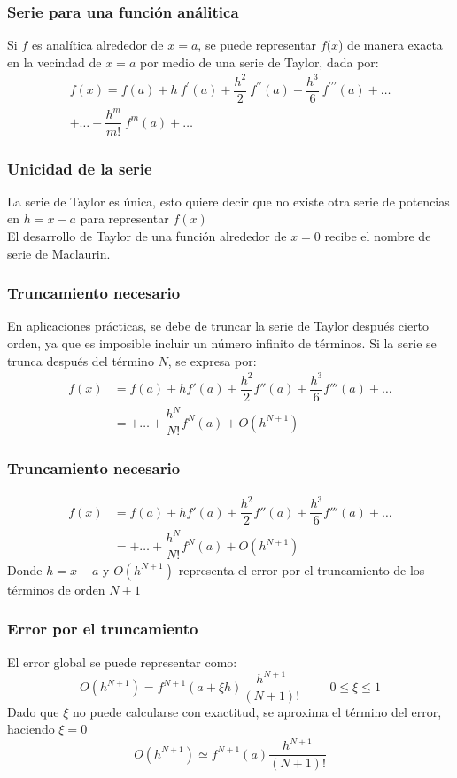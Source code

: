 \begin{frame}
\frametitle{Serie para una función análitica}
Si $f$ es analítica alrededor de $x = a$, se puede representar $f(x$) de manera exacta en la
vecindad de $x = a$ por medio de una serie de Taylor, dada por:
\fontsize{14}{14}\selectfont
\[ \begin{split} 
f(x) = f(a) + h \: f^{\prime}(a) + \dfrac{h^{2}}{2} \: f^{\prime \prime}(a) + \dfrac{h^{3}}{6} \: f^{\prime \prime \prime}(a) + \ldots \\
+ \ldots + \dfrac{h^{m}}{m!} \: f^{m}(a) + \ldots
\end{split}
\]
\end{frame}
\begin{frame}
\frametitle{Unicidad de la serie}
La serie de Taylor es única, esto quiere decir que no existe otra serie de potencias en $h = x-a$ para representar $f(x)$
\\
\bigskip
El desarrollo de Taylor de una función alrededor de $x = 0$ recibe el nombre de serie de Maclaurin.
\end{frame}
\begin{frame}
\frametitle{Truncamiento necesario}
En aplicaciones prácticas, se debe de truncar la serie de Taylor después cierto orden, ya que es imposible incluir un número infinito de términos. Si la serie se trunca después del término $N$, se expresa por:
\[ \begin{split} f(x) &= f(a) + hf'(a) + \dfrac{h^{2}}{2} f''(a) + \dfrac{h^{3}}{6} f'''(a) + \ldots \\
&= + \ldots + \dfrac{h^{N}}{N!} f^{N}(a) + O(h^{N+1}) 
\end{split} \]
\end{frame}
\begin{frame}
\frametitle{Truncamiento necesario}
\[ \begin{split} f(x) &= f(a) + hf'(a) + \dfrac{h^{2}}{2} f''(a) + \dfrac{h^{3}}{6} f'''(a) + \ldots \\
&= + \ldots + \dfrac{h^{N}}{N!} f^{N}(a) + O(h^{N+1}) 
\end{split} \]
Donde $h=x-a$ y $O(h^{N+1})$ representa el error por el truncamiento de los términos de orden $N+1$
\end{frame}
\begin{frame}
\frametitle{Error por el truncamiento}
El error global se puede representar como:
\[O(h^{N+1}) = f^{N+1}(a + \xi h) \dfrac{h^{N+1}}{(N+1)!} \hspace{1cm} 0 \leq \xi \leq 1\]
Dado que $\xi$ no puede calcularse con exactitud, se aproxima el término del error, haciendo $\xi = 0$
\[ O(h^{N+1}) \simeq f^{N+1}(a) \dfrac{h^{N+1}}{(N+1)!}\]
\end{frame}
